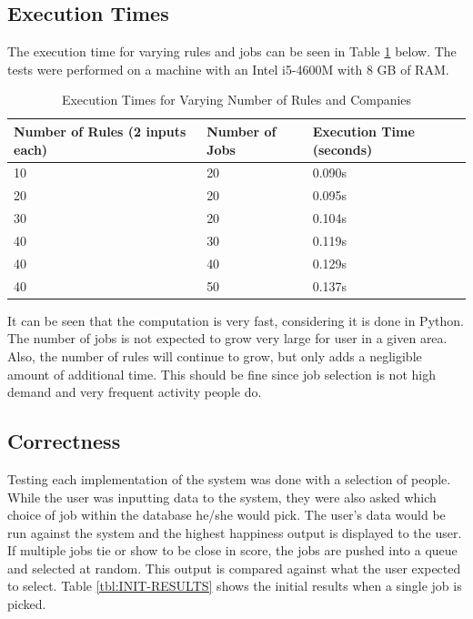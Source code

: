 \documentclass[12pt,fleqn,reqno,letterpaper]{article}
\begin{document}
\subsection{Execution Times}
The execution time for varying rules and jobs can be seen in Table \ref{tbl:EXECUTION-TIMES} below. The tests were performed on a machine with an Intel i5-4600M with 8 GB of RAM.

\begin{table}[h]
  \caption{Execution Times for Varying Number of Rules and Companies}
  \label{tbl:EXECUTION-TIMES}
  \centering
\begin{tabular}{|p{7cm}|p{3.5cm}|p{5.5cm}|}
\hline
\textbf{Number of Rules (2 inputs each)} & \textbf{Number of Jobs} & \textbf{Execution Time (seconds)} \\ \hline
10                                       & 20                      & 0.090s                            \\ \hline
20                                       & 20                      & 0.095s                            \\ \hline
30                                       & 20                      & 0.104s                            \\ \hline
40                                       & 30                      & 0.119s                            \\ \hline
40                                       & 40                      & 0.129s                            \\ \hline
40                                       & 50                      & 0.137s                            \\ \hline
\end{tabular}
\end{table}

It can be seen that the computation is very fast, considering it is done in Python. The number of jobs is not expected to grow very large for user in a given area. Also, the number of rules will continue to grow, but only adds a negligible amount of additional time. This should be fine since job selection is not high demand and very frequent activity people do.

\subsection{Correctness}
Testing each implementation of the system was done with a selection of people.  While the user was inputting data to the system, they were also asked which choice of job within the database he/she would pick.  The user’s data would be run against the system and the highest happiness output is displayed to the user.  If multiple jobs tie or show to be close in score, the jobs are pushed into a queue and selected at random. This output is compared against what the user expected to select.  Table \ref{tbl:INIT-RESULTS} shows the initial results when a single job is picked.
\end{document}
